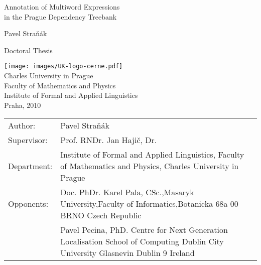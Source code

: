 \documentclass[12pt, a4paper, twopage, titlepage]{book}
\begin{document}
\begin{titlepage}
\setlength\voffset{3cm}
\centering

{\fontsize{21}{32}\selectfont
Annotation of Multiword Expressions \\[3mm]
 in the Prague Dependency Treebank }
\vspace{4cm}

\fontsize{18}{18}\selectfont Pavel Straňák
\vspace{3cm}

\fontsize{12}{14}\selectfont   Doctoral Thesis\\
\vspace{2cm}

\texttt{[image: images/UK-logo-cerne.pdf]}\\
\bigskip
Charles University in Prague\\
Faculty of Mathematics and Physics\\
Institute of Formal and Applied Linguistics\\
\vspace{0.8cm}
Praha, 2010
\end{titlepage}

\phantom{nic}
\thispagestyle{empty}

\begin{table}[htdp]
\begin{center}
\begin{tabular}{lp{7cm}}
Author: & Pavel Straňák \\[1cm]
Supervisor: & Prof. RNDr. Jan Hajič, Dr. \\[1cm]
Department: & Institute of Formal and Applied Linguistics, Faculty of Mathematics and Physics, Charles University in Prague\\[1cm]
Opponents: & 
Doc. PhDr. Karel Pala, CSc.,\newline Masaryk University,\newline Faculty of Informatics,\newline Botanicka 68a\newline 602 00 BRNO \newline Czech Republic \\[0.5cm]
               & Pavel Pecina, PhD.\newline
Centre for Next Generation Localisation\newline
School of Computing\newline
Dublin City University\newline
Glasnevin\newline
Dublin 9\newline
Ireland\\
\end{tabular}
\end{center}
\label{default}
\end{table}%


\tableofcontents
\listoffigures
\listoftables


%











\end{document}
